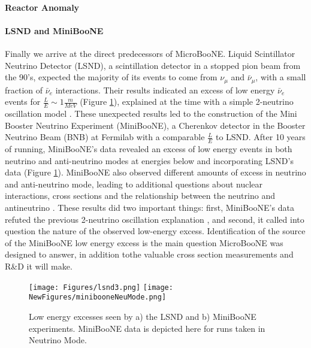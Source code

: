 \documentclass[12pt]{article}
\begin{document}

\paragraph{Reactor Anomaly}

\paragraph{LSND and MiniBooNE}
Finally we arrive at the direct predecessors of MicroBooNE. Liquid Scintillator Neutrino Detector (LSND), a scintillation detector in a stopped pion beam from the 90's, expected the majority of its events to come from $\nu_\mu$ and $\bar{\nu}_\mu$, with a small fraction of $\bar{\nu}_e$ interactions. Their results indicated an excess of low energy $\bar{\nu}_e$ events for $\frac{L}{E} \sim 1 \frac{m}{MeV}$ (Figure \ref{fig:lsnd}), explained at the time with a simple 2-neutrino oscillation model \cite{lsnd}. These unexpected results led to the construction of the Mini Booster Neutrino Experiment (MiniBooNE), a Cherenkov detector in the Booster Neutrino Beam (BNB) at Fermilab with a comparable $\frac{L}{E}$ to LSND. After 10 years of running, MiniBooNE's data revealed an excess of low energy events in both neutrino and anti-neutrino modes at energies below and incorporating LSND's data (Figure \ref{fig:lsnd}).  MiniBooNE also observed different amounts of excess in neutrino and anti-neutrino mode, leading to additional questions about nuclear interactions, cross sections and the relationship between the neutrino and antineutrino \cite{miniboone}.  These results did two important things: first, MiniBooNE's data refuted the previous 2-neutrino oscillation explanation \cite{miniboone}, and second, it called into question the nature of the observed low-energy excess. Identification of the source of the MiniBooNE low energy excess is the main question MicroBooNE was designed to answer, in addition tothe valuable cross section measurements and R\&D it will make. 
\begin{figure}[h!]
\centering
\texttt{[image: Figures/lsnd3.png]}
\hspace{1.5 mm}
\texttt{[image: NewFigures/minibooneNeuMode.png]}
\caption{Low energy excesses seen by a) the LSND and b) MiniBooNE experiments.  MiniBooNE data is depicted here for runs taken in Neutrino Mode.}
\label{fig:lsnd}
\end{figure}
\end{document}
